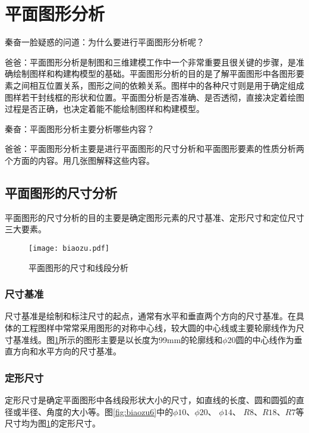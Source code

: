 \section{平面图形分析}
秦奋一脸疑惑的问道：为什么要进行平面图形分析呢？

爸爸：平面图形分析是制图和三维建模工作中一个非常重要且很关键的步骤，是准确绘制图样和构建构模型的基础。平面图形分析的目的是了解平面图形中各图形要素之间相互位置关系，图形之间的依赖关系。图样中的各种尺寸则是用于确定组成图样若干封线框的形状和位置。平面图分析是否准确、是否透彻，直接决定着绘图过程是否正确，也决定着能不能绘制图样和构建模型。

秦奋：平面图形分析主要分析哪些内容？

爸爸：平面图形分析主要是进行平面图形的尺寸分析和平面图形要素的性质分析两个方面的内容。用几张图解释这些内容。

\subsection{平面图形的尺寸分析}
平面图形的尺寸分析的目的主要是确定图形元素的尺寸基准、定形尺寸和定位尺寸三大要素。

\begin{figure}[htbp]
\centering
\texttt{[image: biaozu.pdf]}
\caption{平面图形的尺寸和线段分析} \label{fig:biaozu}
\end{figure}

\subsubsection{尺寸基准} 

尺寸基准是绘制和标注尺寸的起点，通常有水平和垂直两个方向的尺寸基准。在具体的工程图样中常常采用图形的对称中心线，较大圆的中心线或主要轮廓线作为尺寸基准线。图\ref{fig:biaozu}所示的图形主要是以长度为99mm的轮廓线和$\phi 20$圆的中心线作为垂直方向和水平方向的尺寸基准。

\subsubsection{定形尺寸} 

定形尺寸是确定平面图形中各线段形状大小的尺寸，如直线的长度、圆和圆弧的直径或半径、角度的大小等。图\ref{fig:biaozu6}中的$\phi 10$、$\phi 20$、 $\phi 14$、 $R8$、$R18$、$R7$等尺寸均为图\ref{fig:biaozu}的定形尺寸。

\begin{figure}[htbp]
\centering
\begin{floatrow}
\end{floatrow}
\end{figure}

